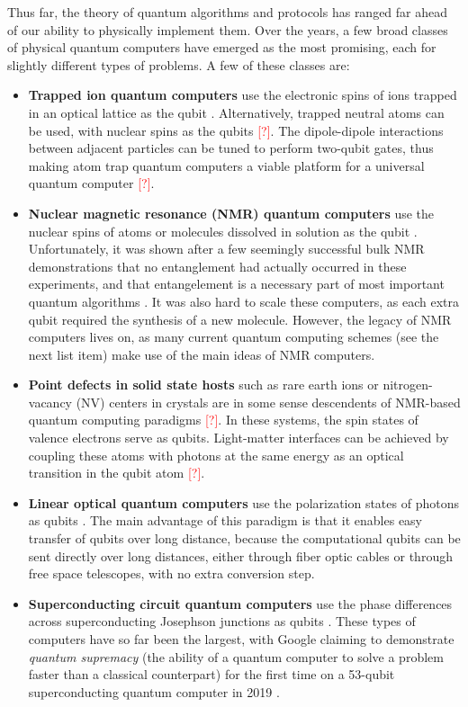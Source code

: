 \documentclass[12pt]{puthesis}
\newcommand{\notetoself}[1]{\textcolor{red}{#1}}
\begin{document}
Thus far, the theory of quantum algorithms and protocols has ranged far ahead of our ability to physically implement them. Over the years, a few broad classes of physical quantum computers have emerged as the most promising, each for slightly different types of problems. A few of these classes are:
\newcommand{\listheader}[1]{\textbf{#1}}
\begin{itemize}
  
\item \listheader{Trapped ion quantum computers} use the electronic spins of ions trapped in an optical lattice as the qubit \cite{Cirac1995}. Alternatively, trapped neutral atoms can be used, with nuclear spins as the qubits \notetoself{[?]}. The dipole-dipole interactions between adjacent particles can be tuned to perform two-qubit gates, thus making atom trap quantum computers a viable platform for a universal quantum computer \notetoself{[?]}.
  
\item \listheader{Nuclear magnetic resonance (NMR) quantum computers} use the nuclear spins of atoms or molecules dissolved in solution as the qubit \cite{Cory1997}. Unfortunately, it was shown after a few seemingly successful bulk NMR demonstrations that no entanglement had actually occurred in these experiments, and that entangelement is a necessary part of most important quantum algorithms \cite{Braunstein1999,Linden2001}. It was also hard to scale these computers, as each extra qubit required the synthesis of a new molecule. However, the legacy of NMR computers lives on, as many current quantum computing schemes (see the next list item) make use of the main ideas of NMR computers.
  
\item \listheader{Point defects in solid state hosts} such as rare earth ions or nitrogen-vacancy (NV) centers in crystals are in some sense descendents of NMR-based quantum computing paradigms \notetoself{[?]}. In these systems, the spin states of valence electrons serve as qubits. Light-matter interfaces can be achieved by coupling these atoms with photons at the same energy as an optical transition in the qubit atom \notetoself{[?]}. 

\item \listheader{Linear optical quantum computers} use the polarization states of photons as qubits \cite{Knill2001}. The main advantage of this paradigm is that it enables easy transfer of qubits over long distance, because the computational qubits can be sent directly over long distances, either through fiber optic cables or through free space telescopes, with no extra conversion step. 
    
\item \listheader{Superconducting circuit quantum computers} use the phase differences across superconducting Josephson junctions as qubits \cite{Nakamura1999}. These types of computers have so far been the largest, with Google claiming to demonstrate \emph{quantum supremacy} (the ability of a quantum computer to solve a problem faster than a classical counterpart) for the first time on a 53-qubit superconducting quantum computer in 2019 \cite{Arute2019}.
  
\end{itemize}
\end{document}
